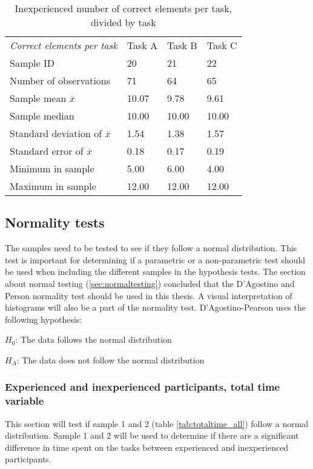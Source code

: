 \begin{table}[H]
	\centering
	\begin{tabular}{l|l|l|l}
		\textit{Correct elements per task} & Task A & Task B & Task C \\ 
		Sample ID & 20 & 21 & 22 \\ \hline
		Number of observations & 71 & 64  & 65 \\
		Sample mean $\overline{x}$  & 10.07  &  9.78 &  9.61  \\
		Sample median  & 10.00  & 10.00  &  10.00  \\
		Standard deviation of $\overline{x}$  & 1.54  & 1.38  & 1.57   \\
		Standard error of $\overline{x}$  & 0.18 & 0.17 & 0.19  \\
		Minimum in sample  & 5.00 & 6.00 &  4.00  \\
		Maximum in sample  & 12.00 & 12.00  & 12.00 \\ \hline
	\end{tabular}
	\caption[Correct elements, inexperienced per task]{Inexperienced number of correct elements per task, divided by task}
	\label{tab:totalcorrect_tasks_inexperienced}
\end{table}
\vspace{0.5cm}

\subsection{Normality tests}\label{sec:normality_results}
The samples need to be tested to see if they follow a normal distribution. This test is important for determining if a parametric or a non-parametric test should be used when including the different samples in the hypothesis tests. The section about normal testing (\ref{sec:normaltesting}) concluded that the D'Agostino and Person normality test should be used in this thesis. A visual interpretation of histograms will also be a part of the normality test. D'Agostino-Pearson uses the following hypothesis:\newline

\centerline{$H_{0}$: The data follows the normal distribution} 
\centerline{$H_{A}$: The data does not follow the normal distribution}


\subsubsection[Sample 1 and 2]{Experienced and inexperienced participants, total time variable}\label{sec:sample1,2_normresult}
This section will test if sample 1 and 2 (table \ref{tab:totaltime_all}) follow a normal distribution. Sample 1 and 2 will be used to determine if there are a significant difference in time spent on the tasks between experienced and inexperienced participants. 

